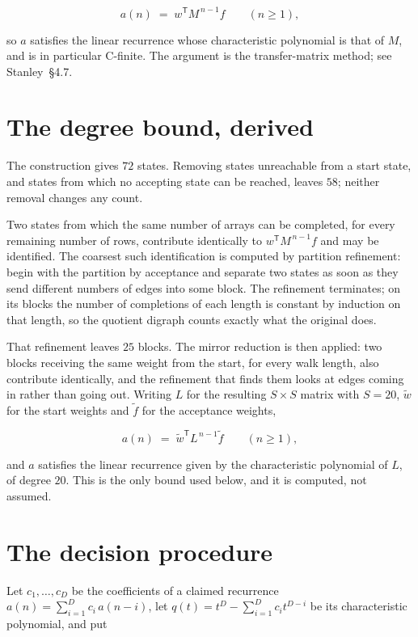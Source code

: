 \documentclass[11pt]{article}
\theoremstyle{definition}
\begin{document}
\[a(n) \;=\; w^{\mathsf T} M^{\,n-1} f \qquad (n \ge 1),\]

so $a$ satisfies the linear recurrence whose characteristic polynomial is that of $M$, and is in particular C-finite. The argument is the transfer-matrix method; see Stanley~\S4.7.

\section{The degree bound, derived}

The construction gives $72$ states. Removing states unreachable from a start state, and states from which no accepting state can be reached, leaves $58$; neither removal changes any count.

Two states from which the same number of arrays can be completed, for every remaining number of rows, contribute identically to $w^{\mathsf T}M^{\,n-1}f$ and may be identified. The coarsest such identification is computed by partition refinement: begin with the partition by acceptance and separate two states as soon as they send different numbers of edges into some block. The refinement terminates; on its blocks the number of completions of each length is constant by induction on that length, so the quotient digraph counts exactly what the original does.

That refinement leaves $25$ blocks. The mirror reduction is then applied: two blocks receiving the same weight from the start, for every walk length, also contribute identically, and the refinement that finds them looks at edges coming in rather than going out. Writing $L$ for the resulting $S \times S$ matrix with $S = 20$, $\tilde w$ for the start weights and $\tilde f$ for the acceptance weights,

\[a(n) \;=\; \tilde w^{\mathsf T} L^{\,n-1} \tilde f \qquad (n \ge 1),\]

and $a$ satisfies the linear recurrence given by the characteristic polynomial of $L$, of degree $20$. This is the only bound used below, and it is computed, not assumed.

\section{The decision procedure}

Let $c_1,\dots,c_D$ be the coefficients of a claimed recurrence $a(n) = \sum_{i=1}^{D} c_i\,a(n-i)$, let $q(t) = t^{D} - \sum_{i=1}^{D} c_i t^{D-i}$ be its characteristic polynomial, and put
\end{document}
